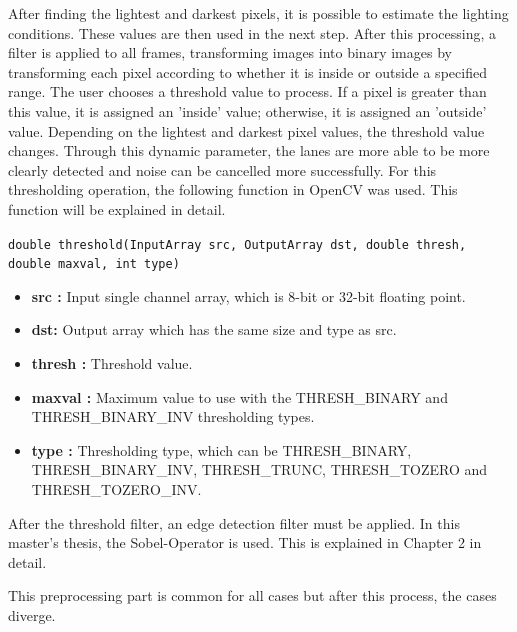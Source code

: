 After finding the lightest and darkest pixels, it is possible to estimate the lighting conditions. These values are then used in the next step. After this processing, a filter is applied to all frames, transforming images into binary images by transforming each pixel according to whether it is inside or outside a specified range. The user chooses a threshold value to process. If a pixel is greater than this value, it is assigned an 'inside' value; otherwise, it is assigned an 'outside' value. Depending on the lightest and darkest pixel values, the threshold value changes. Through this dynamic parameter, the lanes are more able to be more clearly detected and noise can be cancelled more successfully. For this thresholding operation, the following function in OpenCV was used. This function will be explained in detail\cite{threshold}.


\begin{center}

\texttt{double threshold(InputArray src, OutputArray dst, double thresh, double maxval, int type)}

\end{center}

\begin{itemize}

\item \textbf{src : }Input single channel array, which is 8-bit or 32-bit floating point.

\item \textbf{dst: }Output array which has the same size and type as src. 

\item \textbf{thresh : }Threshold value.

\item \textbf{maxval : }Maximum value to use with the THRESH\_BINARY and THRESH\_BINARY\_INV thresholding types.

\item \textbf{type : }Thresholding type, which can be THRESH\_BINARY, THRESH\_BINARY\_INV, THRESH\_TRUNC, THRESH\_TOZERO and THRESH\_TOZERO\_INV.

\end{itemize}




After the threshold filter, an edge detection filter must be applied. In this master's thesis, the Sobel-Operator is used. This is explained in Chapter 2 in detail.
 
This preprocessing part is common for all cases but after this process, the cases diverge. 
 
